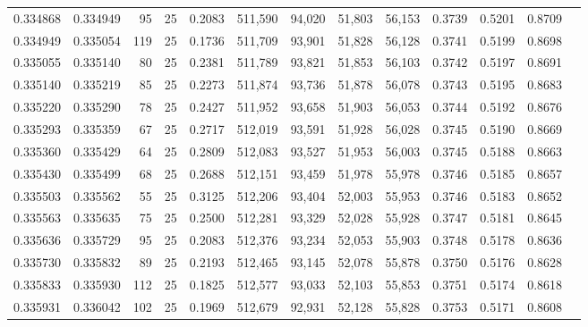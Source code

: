 \begin{tabular}{rrrrrrrrrrrrr}
0.334868 & 0.334949 &    95 &  25 &                                     0.2083 & 511,590 &  94,020 &  51,803 &  56,153 & 0.3739 & 0.5201 & 0.8709 \\
0.334949 & 0.335054 &   119 &  25 &                                     0.1736 & 511,709 &  93,901 &  51,828 &  56,128 & 0.3741 & 0.5199 & 0.8698 \\
0.335055 & 0.335140 &    80 &  25 &                                     0.2381 & 511,789 &  93,821 &  51,853 &  56,103 & 0.3742 & 0.5197 & 0.8691 \\
0.335140 & 0.335219 &    85 &  25 &                                     0.2273 & 511,874 &  93,736 &  51,878 &  56,078 & 0.3743 & 0.5195 & 0.8683 \\
0.335220 & 0.335290 &    78 &  25 &                                     0.2427 & 511,952 &  93,658 &  51,903 &  56,053 & 0.3744 & 0.5192 & 0.8676 \\
0.335293 & 0.335359 &    67 &  25 &                                     0.2717 & 512,019 &  93,591 &  51,928 &  56,028 & 0.3745 & 0.5190 & 0.8669 \\
0.335360 & 0.335429 &    64 &  25 &                                     0.2809 & 512,083 &  93,527 &  51,953 &  56,003 & 0.3745 & 0.5188 & 0.8663 \\
0.335430 & 0.335499 &    68 &  25 &                                     0.2688 & 512,151 &  93,459 &  51,978 &  55,978 & 0.3746 & 0.5185 & 0.8657 \\
0.335503 & 0.335562 &    55 &  25 &                                     0.3125 & 512,206 &  93,404 &  52,003 &  55,953 & 0.3746 & 0.5183 & 0.8652 \\
0.335563 & 0.335635 &    75 &  25 &                                     0.2500 & 512,281 &  93,329 &  52,028 &  55,928 & 0.3747 & 0.5181 & 0.8645 \\
0.335636 & 0.335729 &    95 &  25 &                                     0.2083 & 512,376 &  93,234 &  52,053 &  55,903 & 0.3748 & 0.5178 & 0.8636 \\
0.335730 & 0.335832 &    89 &  25 &                                     0.2193 & 512,465 &  93,145 &  52,078 &  55,878 & 0.3750 & 0.5176 & 0.8628 \\
0.335833 & 0.335930 &   112 &  25 &                                     0.1825 & 512,577 &  93,033 &  52,103 &  55,853 & 0.3751 & 0.5174 & 0.8618 \\
0.335931 & 0.336042 &   102 &  25 &                                     0.1969 & 512,679 &  92,931 &  52,128 &  55,828 & 0.3753 & 0.5171 & 0.8608 \\

\end{tabular}
